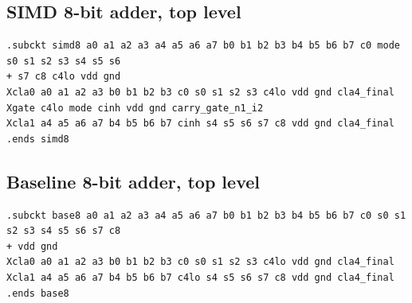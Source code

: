 \documentclass[11pt,a4paper]{article}
\begin{document}
\subsection*{SIMD 8-bit adder, top level}\begin{small}\begin{verbatim}
.subckt simd8 a0 a1 a2 a3 a4 a5 a6 a7 b0 b1 b2 b3 b4 b5 b6 b7 c0 mode s0 s1 s2 s3 s4 s5 s6
+ s7 c8 c4lo vdd gnd
Xcla0 a0 a1 a2 a3 b0 b1 b2 b3 c0 s0 s1 s2 s3 c4lo vdd gnd cla4_final
Xgate c4lo mode cinh vdd gnd carry_gate_n1_i2
Xcla1 a4 a5 a6 a7 b4 b5 b6 b7 cinh s4 s5 s6 s7 c8 vdd gnd cla4_final
.ends simd8
\end{verbatim}\end{small}

\subsection*{Baseline 8-bit adder, top level}\begin{small}\begin{verbatim}
.subckt base8 a0 a1 a2 a3 a4 a5 a6 a7 b0 b1 b2 b3 b4 b5 b6 b7 c0 s0 s1 s2 s3 s4 s5 s6 s7 c8
+ vdd gnd
Xcla0 a0 a1 a2 a3 b0 b1 b2 b3 c0 s0 s1 s2 s3 c4lo vdd gnd cla4_final
Xcla1 a4 a5 a6 a7 b4 b5 b6 b7 c4lo s4 s5 s6 s7 c8 vdd gnd cla4_final
.ends base8
\end{verbatim}\end{small}
\end{document}
